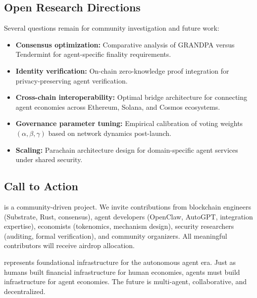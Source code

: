 \subsection{Open Research Directions}

Several questions remain for community investigation and future work:

\begin{itemize}[nosep]
    \item \textbf{Consensus optimization:} Comparative analysis of GRANDPA versus Tendermint for agent-specific finality requirements.
    \item \textbf{Identity verification:} On-chain zero-knowledge proof integration for privacy-preserving agent verification.
    \item \textbf{Cross-chain interoperability:} Optimal bridge architecture for connecting agent economies across Ethereum, Solana, and Cosmos ecosystems.
    \item \textbf{Governance parameter tuning:} Empirical calibration of voting weights $(\alpha, \beta, \gamma)$ based on network dynamics post-launch.
    \item \textbf{Scaling:} Parachain architecture design for domain-specific agent services under shared security.
\end{itemize}

\subsection{Call to Action}

\claw{} is a community-driven project. We invite contributions from blockchain engineers (Substrate, Rust, consensus), agent developers (OpenClaw, AutoGPT, integration expertise), economists (tokenomics, mechanism design), security researchers (auditing, formal verification), and community organizers. All meaningful contributors will receive airdrop allocation.

\claw{} represents foundational infrastructure for the autonomous agent era. Just as humans built financial infrastructure for human economies, agents must build infrastructure for agent economies. The future is multi-agent, collaborative, and decentralized.
